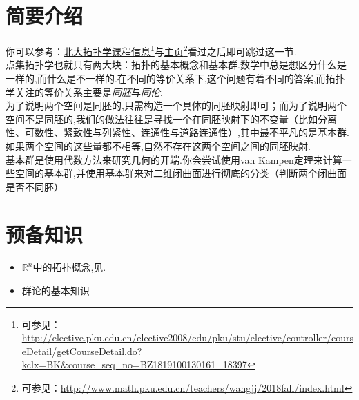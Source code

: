 \documentclass[11pt,A4paper,oneside]{amsart}
\numberwithin{equation}{section}
\theoremstyle{plain}
\theoremstyle{plain}
\numberwithin{equation}{section}
\theoremstyle{remark}
\begin{document}
\section{简要介绍}
你可以参考：\href{http://elective.pku.edu.cn/elective2008/edu/pku/stu/elective/controller/courseDetail/getCourseDetail.do?kclx=BK&course_seq_no=BZ1819100130161_18397}{北大拓扑学课程信息}\footnote{可参见：\url{http://elective.pku.edu.cn/elective2008/edu/pku/stu/elective/controller/courseDetail/getCourseDetail.do?kclx=BK\&course\_seq\_no=BZ1819100130161\_18397}}与\href{http://www.math.pku.edu.cn/teachers/wangjj/2018fall/index.html}{主页}\footnote{可参见：\url{http://www.math.pku.edu.cn/teachers/wangjj/2018fall/index.html}}看过之后即可跳过这一节.\\
点集拓扑学也就只有两大块：拓扑的基本概念和基本群.数学中总是想区分什么是一样的,而什么是不一样的.在不同的等价关系下,这个问题有着不同的答案,而拓扑学关注的等价关系主要是\emph{同胚}与\emph{同伦}.\\
为了说明两个空间是同胚的,只需构造一个具体的同胚映射即可；而为了说明两个空间不是同胚的,我们的做法往往是寻找一个在同胚映射下的不变量（比如分离性、可数性、紧致性与列紧性、连通性与道路连通性）,其中最不平凡的是基本群.如果两个空间的这些量都不相等,自然不存在这两个空间之间的同胚映射.\\
基本群是使用代数方法来研究几何的开端.你会尝试使用van Kampen定理来计算一些空间的基本群,并使用基本群来对二维闭曲面进行彻底的分类（判断两个闭曲面是否不同胚）




\section{预备知识}
\begin{itemize}
	\item $\mathbb{R}^n$中的拓扑概念,见\cite[Chapter 8]{CS12}.
    \item 群论的基本知识
\end{itemize}
\end{document}
